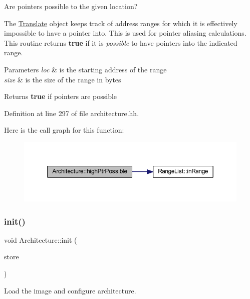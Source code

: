 Are pointers possible to the given location? 

The \mbox{\hyperlink{class_translate}{Translate}} object keeps track of address ranges for which it is effectively impossible to have a pointer into. This is used for pointer aliasing calculations. This routine returns {\bfseries{true}} if it is {\itshape possible} to have pointers into the indicated range. 
\begin{DoxyParams}{Parameters}
{\em loc} & is the starting address of the range \\
\hline
{\em size} & is the size of the range in bytes \\
\hline
\end{DoxyParams}
\begin{DoxyReturn}{Returns}
{\bfseries{true}} if pointers are possible 
\end{DoxyReturn}


Definition at line 297 of file architecture.\+hh.

Here is the call graph for this function\+:
\nopagebreak
\begin{figure}[H]
\begin{center}
\leavevmode
\includegraphics[width=350pt]{class_architecture_a9ec2e6c18d4b1280dc955ec0ace7d476_cgraph}
\end{center}
\end{figure}
\mbox{\label{class_architecture_abcf0d020ebe4248b9b35f3a51b78363b}} 
\subsubsection{\texorpdfstring{init()}{init()}}
{\footnotesize\ttfamily void Architecture\+::init (\begin{DoxyParamCaption}\item[{\mbox{\hyperlink{class_document_storage}{Document\+Storage}} \&}]{store }\end{DoxyParamCaption})}



Load the image and configure architecture. 

